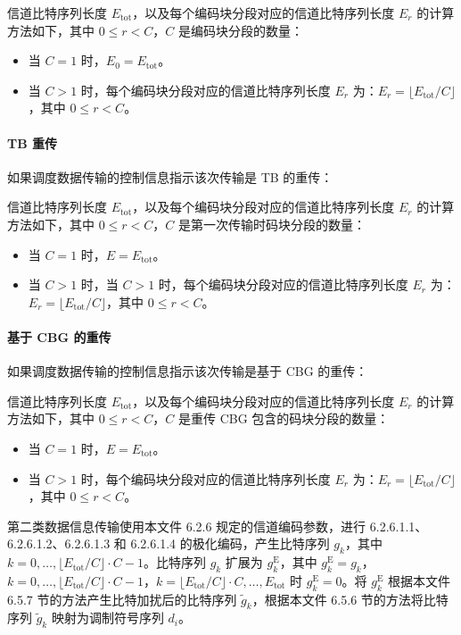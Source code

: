 \documentclass[11pt,a4paper]{ctexart}
\begin{document}
信道比特序列长度 $E_{\mathrm{tot}}$，以及每个编码块分段对应的信道比特序列长度 $E_r$ 的计算方法如下，其中 $0 \leq r < C$，$C$ 是编码块分段的数量：
\begin{itemize}[nosep]
  \item 当 $C = 1$ 时，$E_0 = E_{\mathrm{tot}}$。
  \item 当 $C > 1$ 时，每个编码块分段对应的信道比特序列长度 $E_r$ 为：$E_r = \lfloor E_{\mathrm{tot}} / C \rfloor$，其中 $0 \leq r < C$。
\end{itemize}

\paragraph{TB 重传}

如果调度数据传输的控制信息指示该次传输是 TB 的重传：

信道比特序列长度 $E_{\mathrm{tot}}$，以及每个编码块分段对应的信道比特序列长度 $E_r$ 的计算方法如下，其中 $0 \leq r < C$，$C$ 是第一次传输时码块分段的数量：
\begin{itemize}[nosep]
  \item 当 $C = 1$ 时，$E = E_{\mathrm{tot}}$。
  \item 当 $C > 1$ 时，当 $C > 1$ 时，每个编码块分段对应的信道比特序列长度 $E_r$ 为：$E_r = \lfloor E_{\mathrm{tot}} / C \rfloor$，其中 $0 \leq r < C$。
\end{itemize}

\paragraph{基于 CBG 的重传}

如果调度数据传输的控制信息指示该次传输是基于 CBG 的重传：

信道比特序列长度 $E_{\mathrm{tot}}$，以及每个编码块分段对应的信道比特序列长度 $E_r$ 的计算方法如下，其中 $0 \leq r < C$，$C$ 是重传 CBG 包含的码块分段的数量：
\begin{itemize}[nosep]
  \item 当 $C = 1$ 时，$E = E_{\mathrm{tot}}$。
  \item 当 $C > 1$ 时，每个编码块分段对应的信道比特序列长度 $E_r$ 为：$E_r = \lfloor E_{\mathrm{tot}} / C \rfloor$，其中 $0 \leq r < C$。
\end{itemize}

第二类数据信息传输使用本文件 6.2.6 规定的信道编码参数，进行 6.2.6.1.1、6.2.6.1.2、6.2.6.1.3 和 6.2.6.1.4 的极化编码，产生比特序列 $g_k$，其中 $k = 0, \ldots, \lfloor E_{\mathrm{tot}} / C \rfloor \cdot C - 1$。比特序列 $g_k$ 扩展为 $g^{\mathrm{E}}_k$，其中 $g^{\mathrm{E}}_k = g_k$，$k = 0, \ldots, \lfloor E_{\mathrm{tot}} / C \rfloor \cdot C - 1$，$k = \lfloor E_{\mathrm{tot}} / C \rfloor \cdot C, \ldots, E_{\mathrm{tot}}$ 时 $g^{\mathrm{E}}_k = 0$。将 $g^{\mathrm{E}}_k$ 根据本文件 6.5.7 节的方法产生比特加扰后的比特序列 $\tilde{g}_k$，根据本文件 6.5.6 节的方法将比特序列 $\tilde{g}_k$ 映射为调制符号序列 $d_i$。
\end{document}
